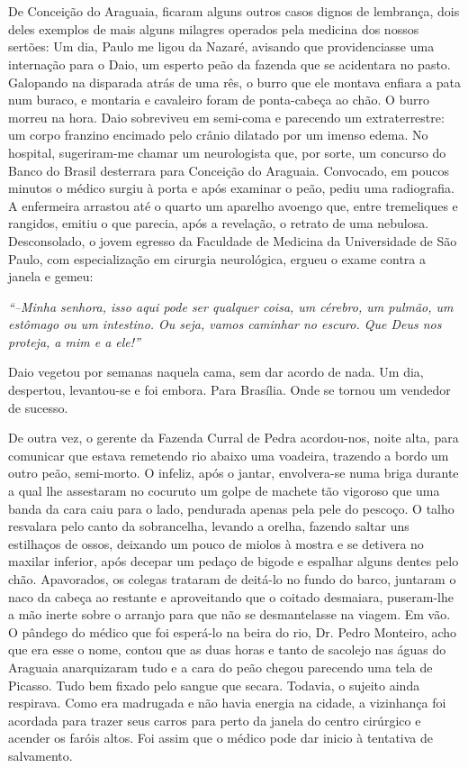 \chapter{}
De Conceição do Araguaia, ficaram alguns outros casos dignos de lembrança, dois deles exemplos de mais alguns milagres operados pela medicina dos nossos sertões: 
Um dia, Paulo me ligou da Nazaré, avisando que providenciasse uma internação para o Daio, um esperto peão da fazenda que se acidentara no pasto.
Galopando na disparada atrás de uma rês, o burro que ele montava enfiara a pata num buraco, e montaria e cavaleiro foram de ponta-cabeça ao chão.
O burro morreu na hora.
Daio sobreviveu em semi-coma e parecendo um extraterrestre: um corpo franzino encimado pelo crânio dilatado por um imenso edema.
No hospital, sugeriram-me chamar um neurologista que, por sorte, um concurso do Banco do Brasil desterrara para Conceição do Araguaia.
Convocado, em poucos minutos o médico surgiu à porta e após examinar o peão, pediu uma radiografia.
A enfermeira arrastou até o quarto um aparelho avoengo que, entre tremeliques e rangidos, emitiu o que parecia, após a revelação, o retrato de uma nebulosa.
Desconsolado, o jovem egresso da Faculdade de Medicina da Universidade de São Paulo, com especialização em cirurgia neurológica, ergueu o exame contra a janela e gemeu:

\textit{``--Minha senhora, isso aqui pode ser qualquer coisa, um cérebro, um pulmão, um estômago ou um intestino.
Ou seja, vamos caminhar no escuro.
Que Deus nos proteja, a mim e a ele!'' }

Daio vegetou por semanas naquela cama, sem dar acordo de nada.
Um dia, despertou, levantou-se e foi embora.
Para Brasília.
Onde se tornou um vendedor de sucesso.

De outra vez, o gerente da Fazenda Curral de Pedra acordou-nos, noite alta, para comunicar que estava remetendo rio abaixo uma voadeira, trazendo a bordo um outro peão, semi-morto.
O infeliz, após o jantar, envolvera-se numa briga durante a qual lhe assestaram no cocuruto um golpe de machete tão vigoroso que uma banda da cara caiu para o lado, pendurada apenas pela pele do pescoço.
O talho resvalara pelo canto da sobrancelha, levando a orelha, fazendo saltar uns estilhaços de ossos, deixando um pouco de miolos à mostra e se detivera no maxilar inferior, após decepar um pedaço de bigode e espalhar alguns dentes pelo chão.
Apavorados, os colegas trataram de deitá-lo no fundo do barco, juntaram o naco da cabeça ao restante e aproveitando que o coitado desmaiara, puseram-lhe a mão inerte sobre o arranjo para que não se desmantelasse na viagem.
Em vão.
O pândego do médico que foi esperá-lo na beira do rio, Dr. Pedro Monteiro, acho que era esse o nome, contou que as duas horas e tanto de sacolejo nas águas  do Araguaia anarquizaram tudo e a cara do peão chegou parecendo uma tela de Picasso.
Tudo bem fixado pelo sangue que secara.
Todavia, o sujeito ainda respirava.
Como era madrugada e não havia energia na cidade, a vizinhança foi acordada para trazer seus carros para perto da janela do centro cirúrgico e acender os faróis altos.
Foi assim que o médico pode dar inicio à tentativa de salvamento.

